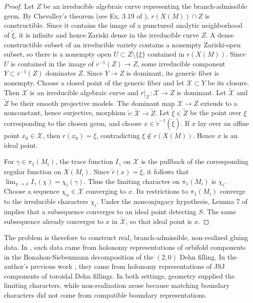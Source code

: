 \documentclass{article}
\theoremstyle{plain}
\theoremstyle{definition}
\theoremstyle{plain}
\theoremstyle{plain}
\theoremstyle{plain}
\theoremstyle{remark}
\theoremstyle{remark}
\theoremstyle{plain}
\theoremstyle{plain}
\theoremstyle{plain}
\theoremstyle{plain}
\begin{document}
\begin{proof}
Let $Z$ be an irreducible algebraic curve representing the branch-admissible germ. By Chevalley's theorem (see Ex. 3.19 of \cite{hartshorne}), $r(X(M)) \cap Z$ is constructible. Since it contains the image of a punctured analytic neighborhood of $\widetilde\xi$, it is infinite and hence Zariski dense in the irreducible curve $Z$. A dense constructible subset of an irreducible variety contains a nonempty Zariski-open subset, so there is a nonempty open $U \subset Z \setminus \{\xi\}$ contained in $r(X(M))$. Since $U$ is contained in the image of $r^{-1}(Z) \to Z$, some irreducible component $Y \subset r^{-1}(Z)$ dominates $Z$. Since $Y \to Z$ is dominant, its generic fiber is nonempty. Choose a closed point of the generic fiber and let $\mathcal X \subset Y$ be its closure. Then $\mathcal X$ is an irreducible algebraic curve and $r|_{\mathcal X}: \mathcal X \to Z$ is dominant. Let $\widetilde{\mathcal{X}}$ and $\widetilde Z$ be their smooth projective models. The dominant map $\mathcal X \to Z$ extends to a nonconstant, hence surjective, morphism $\widetilde r: \widetilde{\mathcal X} \to \widetilde Z$. Let $\widetilde\xi \in \widetilde Z$ be the point over $\xi$ corresponding to the chosen germ, and choose $x \in \widetilde r^{-1}(\widetilde\xi)$. If $x$ lay over an affine point $x_0 \in \mathcal X$, then $r(x_0) = \xi$, contradicting $\xi \notin r(X(M))$. Hence $x$ is an ideal point.

\medskip

For $\gamma \in \pi_1(M_i)$, the trace function $I_\gamma$ on $\mathcal{X}$ is the pullback of the corresponding regular function on $X(M_i)$. Since $\widetilde r(x) = \widetilde\xi$, it follows that $\lim_{\chi \to x}I_\gamma(\chi) = \chi_i(\gamma)$. Thus the limiting character on $\pi_1(M_i)$ is $\chi_i$. Choose a sequence $\chi_n \in \mathcal X$ converging to $x$. Its restrictions to $\pi_1(M_i)$ converge to the irreducible characters $\chi_i$. Under the nonconjugacy hypothesis, Lemma 7 of \cite{paoluzziporti} implies that a subsequence converges to an ideal point detecting $S$. The same subsequence already converges to $x$ in $\widetilde{\mathcal{X}}$, so that ideal point is $x$. 
\end{proof}

The problem is therefore to construct real, branch-admissible, non-realized gluing data. In \cite{paoluzziporti}, such data came from holonomy representations of orbifold components in the Bonahon-Siebenmann decomposition of the $(2, 0)$ Dehn filling. In the author's previous work \cite{WangPuncturedJSJTori, WangLimitingCharacters}, they came from holonomy representations of JSJ components of toroidal Dehn fillings. In both settings, geometry supplied the limiting characters, while non-realization arose because matching boundary characters did not come from compatible boundary representations.
\end{document}
